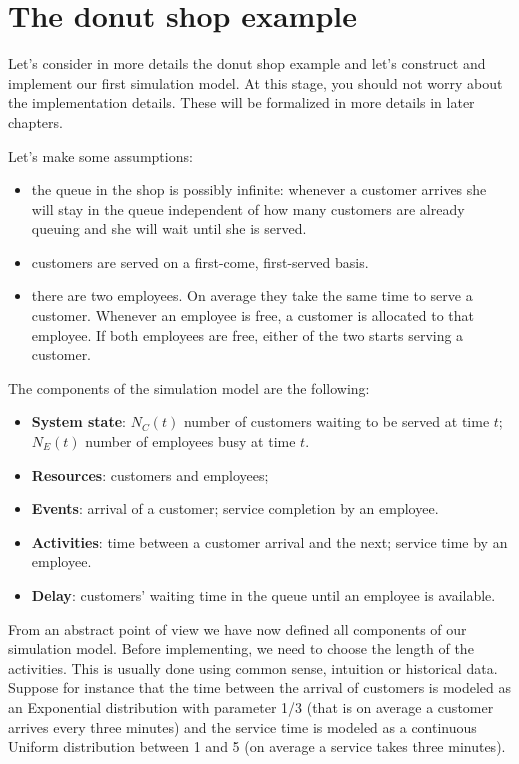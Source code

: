\documentclass[
]{book}
\begin{document}
\hypertarget{the-donut-shop-example}{%
\section{The donut shop example}\label{the-donut-shop-example}}

Let's consider in more details the donut shop example and let's construct and implement our first simulation model. At this stage, you should not worry about the implementation details. These will be formalized in more details in later chapters.

Let's make some assumptions:

\begin{itemize}
\item
  the queue in the shop is possibly infinite: whenever a customer arrives she will stay in the queue independent of how many customers are already queuing and she will wait until she is served.
\item
  customers are served on a first-come, first-served basis.
\item
  there are two employees. On average they take the same time to serve a customer. Whenever an employee is free, a customer is allocated to that employee. If both employees are free, either of the two starts serving a customer.
\end{itemize}

The components of the simulation model are the following:

\begin{itemize}
\item
  \textbf{System state}: \(N_C(t)\) number of customers waiting to be served at time \(t\); \(N_E(t)\) number of employees busy at time \(t\).
\item
  \textbf{Resources}: customers and employees;
\item
  \textbf{Events}: arrival of a customer; service completion by an employee.
\item
  \textbf{Activities}: time between a customer arrival and the next; service time by an employee.
\item
  \textbf{Delay}: customers' waiting time in the queue until an employee is available.
\end{itemize}

From an abstract point of view we have now defined all components of our simulation model. Before implementing, we need to choose the length of the activities. This is usually done using common sense, intuition or historical data. Suppose for instance that the time between the arrival of customers is modeled as an Exponential distribution with parameter 1/3 (that is on average a customer arrives every three minutes) and the service time is modeled as a continuous Uniform distribution between 1 and 5 (on average a service takes three minutes).
\end{document}
